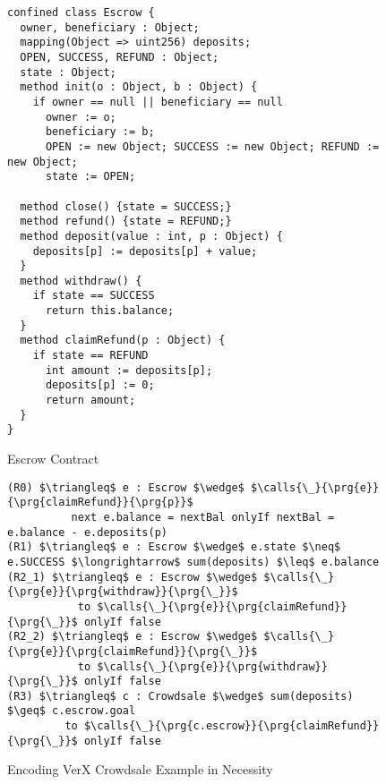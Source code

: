 \begin{figure}[htb]
\begin{lstlisting}[language=chainmail]
confined class Escrow {
  owner, beneficiary : Object;
  mapping(Object => uint256) deposits;
  OPEN, SUCCESS, REFUND : Object;
  state : Object;
  method init(o : Object, b : Object) {
    if owner == null || beneficiary == null
      owner := o;
      beneficiary := b;
      OPEN := new Object; SUCCESS := new Object; REFUND := new Object;
      state := OPEN;
      
  method close() {state = SUCCESS;}
  method refund() {state = REFUND;}
  method deposit(value : int, p : Object) {
    deposits[p] := deposits[p] + value;
  }
  method withdraw() {
    if state == SUCCESS
      return this.balance;
  }
  method claimRefund(p : Object) {
    if state == REFUND
      int amount := deposits[p];
      deposits[p] := 0;
      return amount;
  }
}
\end{lstlisting}
\caption{Escrow Contract}
\label{f:verx:escrow}
\end{figure}

\begin{figure}[htb]
\begin{lstlisting}[mathescape=true, language=chainmail]
(R0) $\triangleq$ e : Escrow $\wedge$ $\calls{\_}{\prg{e}}{\prg{claimRefund}}{\prg{p}}$
          next e.balance = nextBal onlyIf nextBal = e.balance - e.deposits(p)
(R1) $\triangleq$ e : Escrow $\wedge$ e.state $\neq$ e.SUCCESS $\longrightarrow$ sum(deposits) $\leq$ e.balance
(R2_1) $\triangleq$ e : Escrow $\wedge$ $\calls{\_}{\prg{e}}{\prg{withdraw}}{\prg{\_}}$
           to $\calls{\_}{\prg{e}}{\prg{claimRefund}}{\prg{\_}}$ onlyIf false
(R2_2) $\triangleq$ e : Escrow $\wedge$ $\calls{\_}{\prg{e}}{\prg{claimRefund}}{\prg{\_}}$
           to $\calls{\_}{\prg{e}}{\prg{withdraw}}{\prg{\_}}$ onlyIf false
(R3) $\triangleq$ c : Crowdsale $\wedge$ sum(deposits) $\geq$ c.escrow.goal
         to $\calls{\_}{\prg{c.escrow}}{\prg{claimRefund}}{\prg{\_}}$ onlyIf false
\end{lstlisting}
\caption{Encoding VerX Crowdsale Example in Necessity}
\label{f:verx:encoding}
\end{figure}
